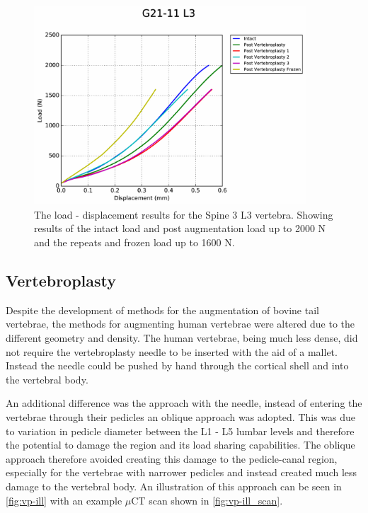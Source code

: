 \begin{figure}[ht!]
  \centering
  \includegraphics[width=4in]{Chapters/Chapter_HT_images/G21-11_L3.pdf}
  \caption{The load - displacement results for the Spine 3 L3 vertebra. Showing
    results of the intact load and post augmentation load up to 2000 N and the
    repeats and frozen load up to 1600 N.}
  \label{fig:Spine3_L3}
\end{figure}






\subsection{Vertebroplasty}

Despite the development of methods for the augmentation of bovine tail
vertebrae, the methods for augmenting human vertebrae were altered due to the
different geometry and density. The human vertebrae, being much less dense, did
not require the vertebroplasty needle to be inserted with the aid of a mallet.
Instead the needle could be pushed by hand through the cortical shell and into
the vertebral body.

An additional difference was the approach with the needle, instead of entering
the vertebrae through their pedicles an oblique approach was adopted. This was
due to variation in pedicle diameter between the L1 - L5 lumbar levels and
therefore the potential to damage the region and its load sharing capabilities.
The oblique approach therefore avoided creating this damage to the
pedicle-canal
region, especially for the vertebrae with narrower pedicles and instead created
much less damage to the vertebral body.
An illustration of this approach can be seen in \cref{fig:vp-ill} with an
example $\mu$CT scan shown in \cref{fig:vp-ill_scan}.



